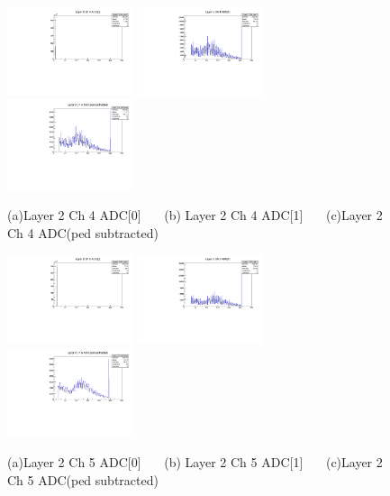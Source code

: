 \documentclass[a4paper,11pt]{article}
\theoremstyle{mytheor}
\begin{document}
\begin{figure}[H] 
\vspace*{-0.3cm} 
\includegraphics[width=0.33\textwidth,scale=0.5,trim=0 0 0 0,clip]{plotsdir/file0_test-Layer2_Ch4_adc0-1.pdf} 
\includegraphics[width=0.33\textwidth,scale=0.5,trim=0 0 0 0,clip]{plotsdir/file0_test-Layer2_Ch4_adc1-1.pdf} 
\includegraphics[width=0.33\textwidth,scale=0.5,trim=0 0 0 0,clip]{plotsdir/file0_test-Layer2_Ch4_adcPedsub-1.pdf} 
\caption{(a)Layer 2 Ch 4 ADC[0] ~~~(b) Layer 2 Ch 4 ADC[1] ~~~(c)Layer 2 Ch 4 ADC(ped subtracted) } 
\end{figure} 
\begin{figure}[H] 
\vspace*{-0.3cm} 
\includegraphics[width=0.33\textwidth,scale=0.5,trim=0 0 0 0,clip]{plotsdir/file0_test-Layer2_Ch5_adc0-1.pdf} 
\includegraphics[width=0.33\textwidth,scale=0.5,trim=0 0 0 0,clip]{plotsdir/file0_test-Layer2_Ch5_adc1-1.pdf} 
\includegraphics[width=0.33\textwidth,scale=0.5,trim=0 0 0 0,clip]{plotsdir/file0_test-Layer2_Ch5_adcPedsub-1.pdf} 
\caption{(a)Layer 2 Ch 5 ADC[0] ~~~(b) Layer 2 Ch 5 ADC[1] ~~~(c)Layer 2 Ch 5 ADC(ped subtracted) } 
\end{figure} 
\end{document}
